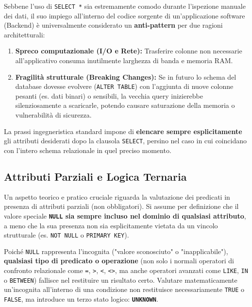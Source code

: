 \begin{warningbox}
Sebbene l'uso di \texttt{SELECT *} sia estremamente comodo durante l'ispezione manuale dei dati, il suo impiego all'interno del codice sorgente di un'applicazione software (Backend) è universalmente considerato un \textbf{anti-pattern} per due ragioni architetturali:
\begin{enumerate}
    \item \textbf{Spreco computazionale (I/O e Rete):} Trasferire colonne non necessarie all'applicativo consuma inutilmente larghezza di banda e memoria RAM.
    \item \textbf{Fragilità strutturale (Breaking Changes):} Se in futuro lo schema del database dovesse evolvere (\texttt{ALTER TABLE}) con l'aggiunta di nuove colonne pesanti (es. dati binari) o sensibili, la vecchia query inizierebbe silenziosamente a scaricarle, potendo causare saturazione della memoria o vulnerabilità di sicurezza.
\end{enumerate}
La prassi ingegneristica standard impone di \textbf{elencare sempre esplicitamente} gli attributi desiderati dopo la clausola \texttt{SELECT}, persino nel caso in cui coincidano con l'intero schema relazionale in quel preciso momento.
\end{warningbox}

\subsection{Attributi Parziali e Logica Ternaria}

Un aspetto teorico e pratico cruciale riguarda la valutazione dei predicati in presenza di attributi parziali (non obbligatori). Si assume per definizione che il valore speciale \textbf{\texttt{NULL} sia sempre incluso nel dominio di qualsiasi attributo}, a meno che la sua presenza non sia esplicitamente vietata da un vincolo strutturale (es. \texttt{NOT NULL} o \texttt{PRIMARY KEY}).

Poiché \texttt{NULL} rappresenta l'incognita ("valore sconosciuto" o "inapplicabile"), \textbf{qualsiasi tipo di predicato o operazione} (non solo i normali operatori di confronto relazionale come \texttt{=}, \texttt{>}, \texttt{<}, \texttt{<>}, ma anche operatori avanzati come \texttt{LIKE}, \texttt{IN} o \texttt{BETWEEN}) fallisce nel restituire un risultato certo. Valutare matematicamente un'incognita all'interno di una condizione non restituisce necessariamente \texttt{TRUE} o \texttt{FALSE}, ma introduce un terzo stato logico: \textbf{\texttt{UNKNOWN}}.

